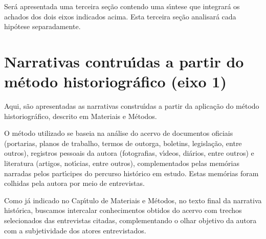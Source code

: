 \documentclass[
12pt,		%
openright,	%
twoside,  %
a4paper,			%
chapter=TITLE,		%
english,			%
french,				%
spanish,			%
brazil				%
]{USPSC-classe/USPSC}
\begin{document}
Ser\'a apresentada uma terceira se\c{c}\~ao contendo uma s\'{\i}ntese que integrar\'a os achados dos dois eixos indicados acima. Esta terceira se\c{c}\~ao analisar\'a cada hip\'otese separadamente.

















\section[Narrativas contru\'{\i}das a partir do m\'etodo historiogr\'afico (eixo 1)]{Narrativas contru\'{\i}das a partir do m\'etodo historiogr\'afico (eixo 1)}\label{Narrativas contru\'{\i}das a partir do m\'etodo historiogr\'afico (eixo 1)}
Aqui, s\~ao apresentadas as narrativas constru\'{\i}das a partir da aplica\c{c}\~ao do m\'etodo historiogr\'afico, descrito em Materiais e M\'etodos.

















O m\'etodo utilizado se baseia na an\'alise do acervo de documentos oficiais (portarias, planos de trabalho, termos de outorga, boletins, legisla\c{c}\~ao, entre outros), registros pessoais da autora (fotografias, v\'{\i}deos, di\'arios, entre outros) e literatura (artigos, not\'{\i}cias, entre outros), complementados pelas mem\'orias narradas pelos part\'{\i}cipes do percurso hist\'orico em estudo. Estas mem\'orias foram colhidas pela autora por meio de entrevistas.

















Como j\'a indicado no Cap\'{\i}tulo de Materiais e M\'etodos, no texto final da narrativa hist\'orica, buscamos intercalar conhecimentos obtidos do acervo com trechos selecionados das entrevistas citadas, complementando o olhar objetivo da autora com a subjetividade dos atores entrevistados.
\end{document}
